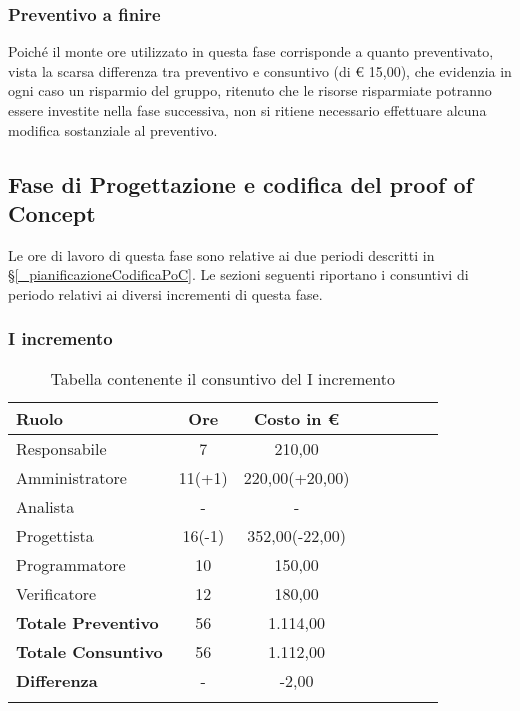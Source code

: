 \subsubsection{Preventivo a finire}
Poiché il monte ore utilizzato in questa fase corrisponde a quanto preventivato, vista la scarsa differenza tra preventivo e consuntivo (di € 15,00), che evidenzia in ogni caso un risparmio del gruppo, ritenuto che le risorse risparmiate potranno essere investite nella fase successiva, non si ritiene necessario effettuare alcuna modifica sostanziale al preventivo.



\subsection{Fase di Progettazione e codifica del proof of Concept} \label{_consuntivoPoC}
Le ore di lavoro di questa fase sono relative ai due periodi descritti in \S\ref{_pianificazioneCodificaPoC}.
Le sezioni seguenti riportano i consuntivi di periodo relativi ai diversi incrementi di questa fase.

\subsubsection{I incremento}
\begin{longtable}{|l|c|c|c|c|c|c|c|}
	\hline
	\rowcolor{lighter-grayer}
	\textbf{Ruolo}             & \textbf{Ore} & \textbf{Costo in €} \\
	\hline
	\endfirsthead

	\hline
	Responsabile               & 7           & 210,00              \\
	\hline
	\hline
	Amministratore             & 11(+1)       & 220,00(+20,00)      \\
	\hline
	\hline
	Analista                   & -       & -   \\
	\hline
	\hline
	Progettista                & 16(-1)            & 352,00(-22,00)              \\
	\hline
	\hline
	Programmatore              & 10            & 150,00                   \\
	\hline
	\hline
	Verificatore               & 12       & 180,00    \\
	\hline
	\textbf{Totale Preventivo} & 56          & 1.114,00            \\
	\hline
	\hline
	\textbf{Totale Consuntivo} & 56          & 1.112,00            \\
	\hline
	\hline
	\textbf{Differenza}        & -           & -2,00           \\
	\hline
	\rowcolor{white}
	\caption{Tabella contenente il consuntivo del I incremento}
\end{longtable}
